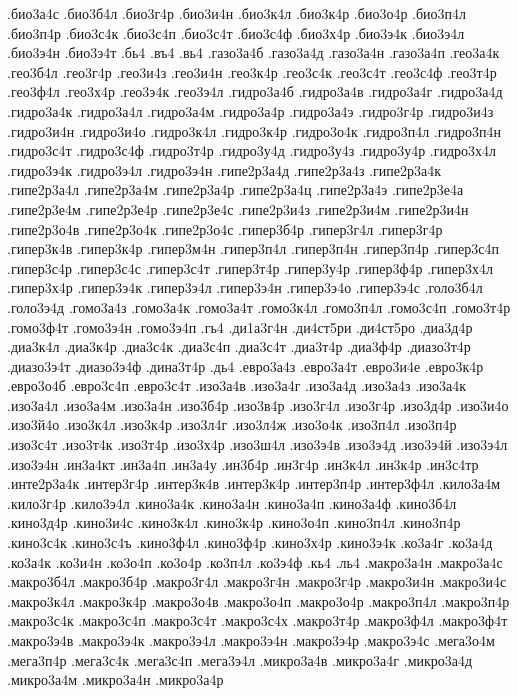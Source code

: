 {.био3а4с
.био3б4л
.био3г4р
.био3и4н
.био3к4л
.био3к4р
.био3о4р
.био3п4л
.био3п4р
.био3с4к
.био3с4п
.био3с4т
.био3с4ф
.био3х4р
.био3э4к
.био3э4л
.био3э4н
.био3э4т
.бь4
.въ4
.вь4
.газо3а4б
.газо3а4д
.газо3а4н
.газо3а4п
.гео3а4к
.гео3б4л
.гео3г4р
.гео3и4з
.гео3и4н
.гео3к4р
.гео3с4к
.гео3с4т
.гео3с4ф
.гео3т4р
.гео3ф4л
.гео3х4р
.гео3э4к
.гео3э4л
.гидро3а4б
.гидро3а4в
.гидро3а4г
.гидро3а4д
.гидро3а4к
.гидро3а4л
.гидро3а4м
.гидро3а4р
.гидро3а4э
.гидро3г4р
.гидро3и4з
.гидро3и4н
.гидро3и4о
.гидро3к4л
.гидро3к4р
.гидро3о4к
.гидро3п4л
.гидро3п4н
.гидро3с4т
.гидро3с4ф
.гидро3т4р
.гидро3у4д
.гидро3у4з
.гидро3у4р
.гидро3х4л
.гидро3э4к
.гидро3э4л
.гидро3э4н
.гипе2р3а4д
.гипе2р3а4з
.гипе2р3а4к
.гипе2р3а4л
.гипе2р3а4м
.гипе2р3а4р
.гипе2р3а4ц
.гипе2р3а4э
.гипе2р3е4а
.гипе2р3е4м
.гипе2р3е4р
.гипе2р3е4с
.гипе2р3и4з
.гипе2р3и4м
.гипе2р3и4н
.гипе2р3о4в
.гипе2р3о4к
.гипе2р3о4с
.гипер3б4р
.гипер3г4л
.гипер3г4р
.гипер3к4в
.гипер3к4р
.гипер3м4н
.гипер3п4л
.гипер3п4н
.гипер3п4р
.гипер3с4п
.гипер3с4р
.гипер3с4с
.гипер3с4т
.гипер3т4р
.гипер3у4р
.гипер3ф4р
.гипер3х4л
.гипер3х4р
.гипер3э4к
.гипер3э4л
.гипер3э4н
.гипер3э4о
.гипер3э4с
.голо3б4л
.голо3э4д
.гомо3а4з
.гомо3а4к
.гомо3а4т
.гомо3к4л
.гомо3п4л
.гомо3с4п
.гомо3т4р
.гомо3ф4т
.гомо3э4н
.гомо3э4п
.гь4
.ди1а3г4н
.ди4ст5ри
.ди4ст5ро
.диа3д4р
.диа3к4л
.диа3к4р
.диа3с4к
.диа3с4п
.диа3с4т
.диа3т4р
.диа3ф4р
.диазо3т4р
.диазо3э4т
.диазо3э4ф
.дина3т4р
.дь4
.евро3а4з
.евро3а4т
.евро3и4е
.евро3к4р
.евро3о4б
.евро3с4п
.евро3с4т
.изо3а4в
.изо3а4г
.изо3а4д
.изо3а4з
.изо3а4к
.изо3а4л
.изо3а4м
.изо3а4н
.изо3б4р
.изо3в4р
.изо3г4л
.изо3г4р
.изо3д4р
.изо3и4о
.изо3й4о
.изо3к4л
.изо3к4р
.изо3л4г
.изо3л4ж
.изо3о4к
.изо3п4л
.изо3п4р
.изо3с4т
.изо3т4к
.изо3т4р
.изо3х4р
.изо3ш4л
.изо3э4в
.изо3э4д
.изо3э4й
.изо3э4л
.изо3э4н
.ин3а4кт
.ин3а4п
.ин3а4у
.ин3б4р
.ин3г4р
.ин3к4л
.ин3к4р
.ин3с4тр
.инте2р3а4к
.интер3г4р
.интер3к4в
.интер3к4р
.интер3п4р
.интер3ф4л
.кило3а4м
.кило3г4р
.кило3э4л
.кино3а4к
.кино3а4н
.кино3а4п
.кино3а4ф
.кино3б4л
.кино3д4р
.кино3и4с
.кино3к4л
.кино3к4р
.кино3о4п
.кино3п4л
.кино3п4р
.кино3с4к
.кино3с4ъ
.кино3ф4л
.кино3ф4р
.кино3х4р
.кино3э4к
.ко3а4г
.ко3а4д
.ко3а4к
.ко3и4н
.ко3о4п
.ко3о4р
.ко3п4л
.ко3э4ф
.кь4
.ль4
.макро3а4н
.макро3а4с
.макро3б4л
.макро3б4р
.макро3г4л
.макро3г4н
.макро3г4р
.макро3и4н
.макро3и4с
.макро3к4л
.макро3к4р
.макро3о4в
.макро3о4п
.макро3о4р
.макро3п4л
.макро3п4р
.макро3с4к
.макро3с4п
.макро3с4т
.макро3с4х
.макро3т4р
.макро3ф4л
.макро3ф4т
.макро3э4в
.макро3э4к
.макро3э4л
.макро3э4н
.макро3э4р
.макро3э4с
.мега3о4м
.мега3п4р
.мега3с4к
.мега3с4п
.мега3э4л
.микро3а4в
.микро3а4г
.микро3а4д
.микро3а4м
.микро3а4н
.микро3а4р
}
